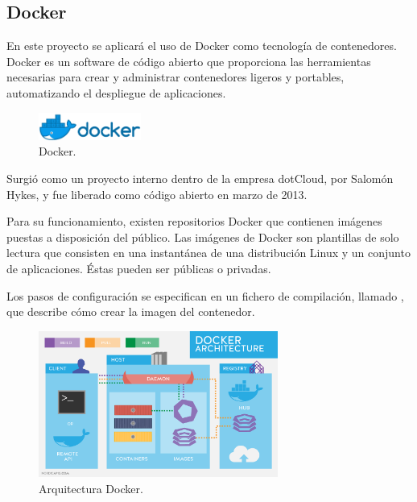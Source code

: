 
\subsection{Docker}

En este proyecto se aplicará el uso de Docker como tecnología de contenedores. Docker es un software de código abierto que proporciona las herramientas necesarias para crear y administrar contenedores ligeros y portables, automatizando el despliegue de aplicaciones.

\begin{figure}[H]
\centering
\includegraphics[width=0.3\textwidth]{images/figures/docker.png}
\caption{Docker.\footnotemark}
\end{figure}


Surgió como un proyecto interno dentro de la empresa dotCloud, por Salomón Hykes, y fue liberado como código abierto en marzo de 2013.

Para su funcionamiento, existen repositorios Docker que contienen imágenes puestas a disposición del público. Las imágenes de Docker son plantillas de solo lectura que consisten en una instantánea de una distribución Linux y un conjunto de aplicaciones. Éstas pueden ser públicas o privadas.

Los pasos de configuración se especifican en un fichero de compilación, llamado , que describe cómo crear la imagen del contenedor.

\begin{figure}[H]
\centering
\includegraphics[width=0.7\textwidth]{images/figures/dockerarchitecture.png}
\caption{Arquitectura Docker.\footnotemark}
\end{figure}

